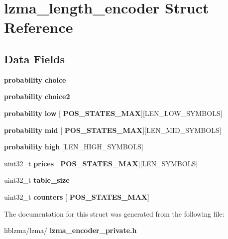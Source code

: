 \section{lzma\+\_\+length\+\_\+encoder Struct Reference}
\label{structlzma__length__encoder}
\subsection*{Data Fields}
\begin{DoxyCompactItemize}
\item 
\mbox{\label{structlzma__length__encoder_add23b6aade7f924329286d12f986ca1e}} 
\textbf{ probability} {\bfseries choice}
\item 
\mbox{\label{structlzma__length__encoder_ab3206c84782acc002aacc00291483c4d}} 
\textbf{ probability} {\bfseries choice2}
\item 
\mbox{\label{structlzma__length__encoder_a55fd25066543d993628c5fcbe61f33a4}} 
\textbf{ probability} {\bfseries low} [\textbf{ P\+O\+S\+\_\+\+S\+T\+A\+T\+E\+S\+\_\+\+M\+AX}][L\+E\+N\+\_\+\+L\+O\+W\+\_\+\+S\+Y\+M\+B\+O\+LS]
\item 
\mbox{\label{structlzma__length__encoder_aafe93b2fdb31ac9173f7059d84bd8ef4}} 
\textbf{ probability} {\bfseries mid} [\textbf{ P\+O\+S\+\_\+\+S\+T\+A\+T\+E\+S\+\_\+\+M\+AX}][L\+E\+N\+\_\+\+M\+I\+D\+\_\+\+S\+Y\+M\+B\+O\+LS]
\item 
\mbox{\label{structlzma__length__encoder_a53d29418c873017528f931a42b20eeb0}} 
\textbf{ probability} {\bfseries high} [L\+E\+N\+\_\+\+H\+I\+G\+H\+\_\+\+S\+Y\+M\+B\+O\+LS]
\item 
\mbox{\label{structlzma__length__encoder_af9ee57976244e8392426369ae8b9133d}} 
uint32\+\_\+t {\bfseries prices} [\textbf{ P\+O\+S\+\_\+\+S\+T\+A\+T\+E\+S\+\_\+\+M\+AX}][L\+E\+N\+\_\+\+S\+Y\+M\+B\+O\+LS]
\item 
\mbox{\label{structlzma__length__encoder_a381e1edd41f2a0433d8f50eb230cb88d}} 
uint32\+\_\+t {\bfseries table\+\_\+size}
\item 
\mbox{\label{structlzma__length__encoder_a9dfa0dc80c7b50d579a6dd6d3b076642}} 
uint32\+\_\+t {\bfseries counters} [\textbf{ P\+O\+S\+\_\+\+S\+T\+A\+T\+E\+S\+\_\+\+M\+AX}]
\end{DoxyCompactItemize}


The documentation for this struct was generated from the following file\+:\begin{DoxyCompactItemize}
\item 
liblzma/lzma/\textbf{ lzma\+\_\+encoder\+\_\+private.\+h}\end{DoxyCompactItemize}
